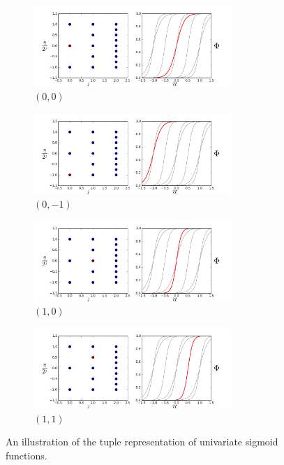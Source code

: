 \begin{figure}[htbp]\begin{center}
    \begin{subfigure}[t]{.48\textwidth}
        \centering
        \includegraphics[width=7.5cm]{../basis_0.png}
        \caption{$\left(0,0\right)$}
        \label{fig: basis 0}
    \end{subfigure}
    \begin{subfigure}[t]{.48\textwidth}
        \centering
        \includegraphics[width=7.5cm]{../basis_1.png}
        \caption{$\left(0, -1\right)$}
        \label{fig: basis 1}
    \end{subfigure}
    \begin{subfigure}[t]{.48\textwidth}
        \centering
        \includegraphics[width=7.5cm]{../basis_3.png}
        \caption{$\left(1, 0\right)$}
        \label{fig: basis 2}
    \end{subfigure}
    \begin{subfigure}[t]{.48\textwidth}
        \centering
        \includegraphics[width=7.5cm]{../basis_6.png}
        \caption{$\left(1, 1\right)$}
        \label{fig: basis 3}
    \end{subfigure}
    \caption{An illustration of the tuple representation of univariate sigmoid functions.}
\end{center}\end{figure}

